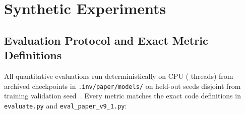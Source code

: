 \documentclass[11pt,a4paper]{article}
\begin{document}
\section{Synthetic Experiments}
\label{sec:experiments}

\subsection{Evaluation Protocol and Exact Metric Definitions}

All quantitative evaluations run deterministically on CPU (\valCpuThreads{} threads) from archived checkpoints in \texttt{.inv/paper/models/} on held-out seeds disjoint from training validation seed~\valTrainValSeed{}. Every metric matches the exact code definitions in \texttt{evaluate.py} and \texttt{eval\_paper\_v9\_1.py}:
\end{document}
